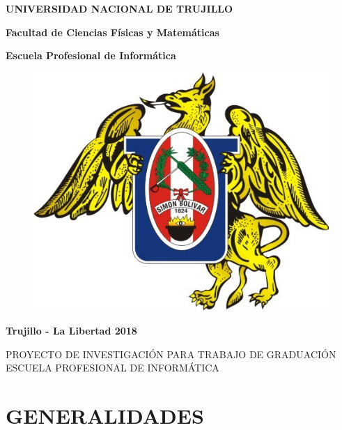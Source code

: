 \documentclass[a4paper, 12pt]{article}
\begin{document}
\begin{center}
 {\bf {\fontsize{14}{16.8}\selectfont UNIVERSIDAD NACIONAL DE TRUJILLO}}     
 
    {\bf{\fontsize{14}{16.8}\selectfont Facultad de Ciencias Físicas y Matemáticas}} 

  {\bf{\fontsize{14}{16.8}\selectfont Escuela Profesional de Informática}}
\end{center}  

\begin{figure}[ht]
\begin{center}
\includegraphics[width=.3\textwidth]{unt}
\end{center}
\end{figure}

\vskip 2cm
\begin{center}
  { \bf {\fontsize{17}{20.4}\selectfont{PREDICCIÓN DE LA RESPUESTA CORRECTA DE UNA PREGUNTA DE OPCIÓN MÚLTIPLE MEDIANTE TÉCNICAS DE APRENDIZAJE NO SUPERVISADO ASOCIADO CON LA EXPERIENCIA.}  } } 
\end{center}   
  \vskip 1cm
  { \bf {\fontsize{17}{20.4}}  } 
  \vskip 1cm
  { \bf {\fontsize{17}{20.4}}  } 
\vskip 4cm
\begin{center}    
{\bf {\fontsize{14}{16.8}\selectfont Trujillo - La Libertad
\vskip 0.0cm
\hspace*{-0.2cm} 
\vskip 0.1cm
2018 }}
\end{center} 
\newpage

\begin{center}
\Large {PROYECTO DE INVESTIGACIÓN PARA TRABAJO DE GRADUACIÓN \\
\vskip 0.2cm
 ESCUELA PROFESIONAL DE INFORMÁTICA}
\end{center}
\vskip 1cm

\section{GENERALIDADES}
\end{document}
